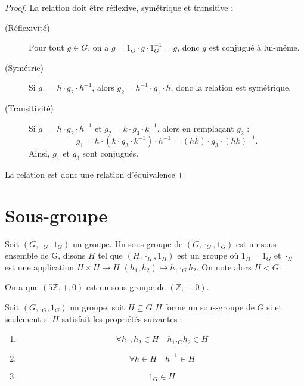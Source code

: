 \begin{proof}
    La relation doit être réflexive, symétrique et transitive :
    \begin{description}
        \item[(Réflexivité)] Pour tout $g \in G$, on a $g = 1_G \cdot g \cdot 1_G^{-1} = g$, donc $g$ est conjugué à lui-même.
        \item[(Symétrie)] Si $g_1 = h \cdot g_2 \cdot h^{-1}$, alors $g_2 = h^{-1} \cdot g_1 \cdot h$, donc la relation est symétrique.
        \item[(Transitivité)]Si $g_1 = h \cdot g_2 \cdot h^{-1}$ et $g_2 = k \cdot g_3 \cdot k^{-1}$, alors en remplaçant $g_2$ :
        \begin{equation*}
            g_1 = h \cdot (k \cdot g_3 \cdot k^{-1}) \cdot h^{-1} = (h k) \cdot g_3 \cdot (h k)^{-1}.
        \end{equation*}
        Ainsi, $g_1$ et $g_3$ sont conjugués.
    \end{description}
La relation est donc une relation d’équivalence
\end{proof}

\section{Sous-groupe}

\begin{definition}
    Soit $(G,\cdot_G,1_G)$ un groupe. Un sous-groupe de $(G,\cdot_G,1_G)$ est un sous ensemble de G, disons $H$ tel que $(H,\cdot_H,1_H)$ est un groupe où $1_H=1_G$ et $\cdot_H$ est une application $H\times H \to H$
    $(h_1,h_2)\mapsto h_1\cdot_Gh_2$. On note alors $H<G$.
\end{definition}

\begin{exemple}
    On a que $(5\mathbb{Z},+,0)$ est un sous-groupe de $(\mathbb{Z},+,0)$.
\end{exemple}

\begin{proposition}
    Soit $(G,._G,1_G)$ un groupe, soit $H\subseteq G$ $H$ forme un sous-groupe de $G$ si et seulement si $H$ satisfait les propriétés suivantes :
\begin{enumerate}
    \item \[\forall h_1,h_2\in H \quad h_1._Gh_2\in H\]
    \item \[\forall h\in H \quad h^{-1}\in H\]
    \item \[1_G\in H\]
\end{enumerate}
\end{proposition}

